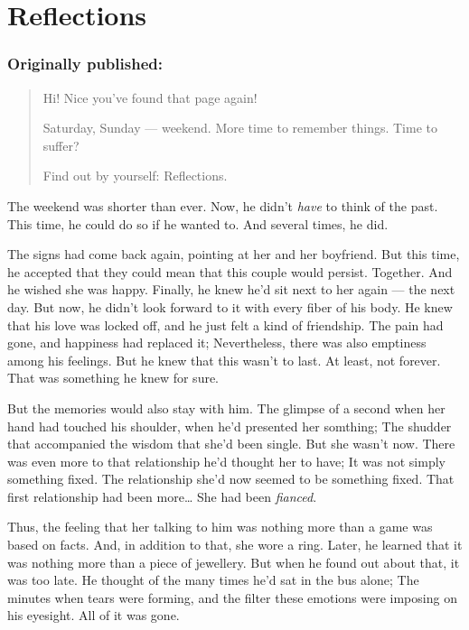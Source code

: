 \chapter{Reflections}
\label{cha:reflections}
\subsection*{Originally published: }
\begin{quote}
Hi! Nice you've found that page again!

Saturday, Sunday --- weekend. 
More time to remember things. 
Time to suffer?

Find out by yourself: Reflections.
\end{quote}

The weekend was shorter than ever. 
Now, he didn't \emph{have} to think of the past. 
This time, he could do so if he wanted to. 
And several times, he did.

The signs had come back again, pointing at her and her boyfriend. But this time, he accepted that they could mean that this couple would persist. Together. 
And he wished she was happy. 
Finally, he knew he'd sit next to her again --- the next day. 
But now, he didn't look forward to it with every fiber of his body. 
He knew that his love was locked off, and he just felt a kind of friendship. The pain had gone, and happiness had replaced it; Nevertheless, there was also emptiness among his feelings. 
But he knew that this wasn't to last. 
At least, not forever. 
That was something he knew for sure.

But the memories would also stay with him. 
The glimpse of a second when her hand had touched his shoulder, when he'd presented her somthing; The shudder that accompanied the wisdom that she'd been single. 
But she wasn't now. 
There was even more to that relationship he'd thought her to have; It was not simply something fixed. The relationship she'd now seemed to be something fixed. That first relationship had been more\dots{}
She had been \emph{fianced}.

Thus, the feeling that her talking to him was nothing more than a game was based on facts. 
And, in addition to that, she wore a ring. 
Later, he learned that it was nothing more than a piece of jewellery. 
But when he found out about that, it was too late. 
He thought of the many times he'd sat in the bus alone; The minutes when tears were forming, and the filter these emotions were imposing on his eyesight. 
All of it was gone.

